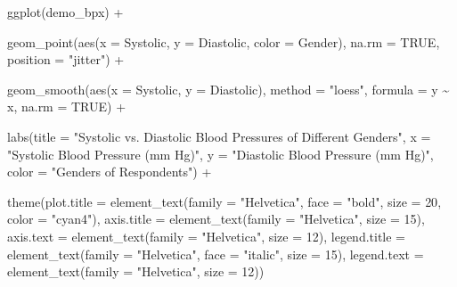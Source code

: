 \documentclass[
]{book}
\newenvironment{Shaded}{\begin{snugshade}}{\end{snugshade}}
\newcommand{\AttributeTok}[1]{\textcolor[rgb]{0.77,0.63,0.00}{#1}}
\newcommand{\ConstantTok}[1]{\textcolor[rgb]{0.00,0.00,0.00}{#1}}
\newcommand{\DecValTok}[1]{\textcolor[rgb]{0.00,0.00,0.81}{#1}}
\newcommand{\FunctionTok}[1]{\textcolor[rgb]{0.00,0.00,0.00}{#1}}
\newcommand{\NormalTok}[1]{#1}
\newcommand{\SpecialCharTok}[1]{\textcolor[rgb]{0.00,0.00,0.00}{#1}}
\newcommand{\StringTok}[1]{\textcolor[rgb]{0.31,0.60,0.02}{#1}}
\begin{document}
\begin{Shaded}
\begin{Highlighting}[]
\FunctionTok{ggplot}\NormalTok{(demo\_bpx) }\SpecialCharTok{+}

    \FunctionTok{geom\_point}\NormalTok{(}\FunctionTok{aes}\NormalTok{(}\AttributeTok{x =}\NormalTok{ Systolic, }\AttributeTok{y =}\NormalTok{ Diastolic, }\AttributeTok{color =}\NormalTok{ Gender), }
             \AttributeTok{na.rm =} \ConstantTok{TRUE}\NormalTok{,}
             \AttributeTok{position =} \StringTok{"jitter"}\NormalTok{) }\SpecialCharTok{+}

    \FunctionTok{geom\_smooth}\NormalTok{(}\FunctionTok{aes}\NormalTok{(}\AttributeTok{x =}\NormalTok{ Systolic, }\AttributeTok{y =}\NormalTok{ Diastolic),}
                \AttributeTok{method =} \StringTok{"loess"}\NormalTok{,}
                \AttributeTok{formula =}\NormalTok{ y }\SpecialCharTok{\textasciitilde{}}\NormalTok{ x,}
                \AttributeTok{na.rm =} \ConstantTok{TRUE}\NormalTok{) }\SpecialCharTok{+}

    \FunctionTok{labs}\NormalTok{(}\AttributeTok{title =} \StringTok{"Systolic vs. Diastolic Blood Pressures of Different Genders"}\NormalTok{,}
         \AttributeTok{x =} \StringTok{"Systolic Blood Pressure (mm Hg)"}\NormalTok{, }
         \AttributeTok{y =} \StringTok{"Diastolic Blood Pressure (mm Hg)"}\NormalTok{,}
         \AttributeTok{color =} \StringTok{"Genders of Respondents"}\NormalTok{) }\SpecialCharTok{+}

    \FunctionTok{theme}\NormalTok{(}\AttributeTok{plot.title =} \FunctionTok{element\_text}\NormalTok{(}\AttributeTok{family =} \StringTok{"Helvetica"}\NormalTok{, }\AttributeTok{face =} \StringTok{"bold"}\NormalTok{, }\AttributeTok{size =} \DecValTok{20}\NormalTok{, }\AttributeTok{color =} \StringTok{"cyan4"}\NormalTok{),}
          \AttributeTok{axis.title =} \FunctionTok{element\_text}\NormalTok{(}\AttributeTok{family =} \StringTok{"Helvetica"}\NormalTok{, }\AttributeTok{size =} \DecValTok{15}\NormalTok{),}
          \AttributeTok{axis.text =} \FunctionTok{element\_text}\NormalTok{(}\AttributeTok{family =} \StringTok{"Helvetica"}\NormalTok{, }\AttributeTok{size =} \DecValTok{12}\NormalTok{),}
          \AttributeTok{legend.title =} \FunctionTok{element\_text}\NormalTok{(}\AttributeTok{family =} \StringTok{"Helvetica"}\NormalTok{, }\AttributeTok{face =} \StringTok{"italic"}\NormalTok{, }\AttributeTok{size =} \DecValTok{15}\NormalTok{), }
          \AttributeTok{legend.text =} \FunctionTok{element\_text}\NormalTok{(}\AttributeTok{family =} \StringTok{"Helvetica"}\NormalTok{, }\AttributeTok{size =} \DecValTok{12}\NormalTok{))}
\end{Highlighting}
\end{Shaded}
\end{document}
